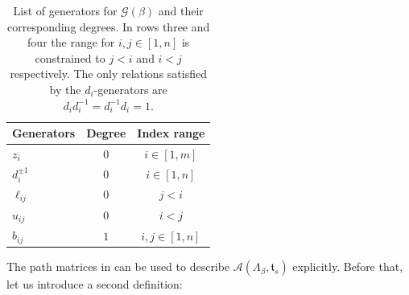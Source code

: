 \documentclass[11pt]{article}
\newcommand{\La}{\Lambda}
\newcommand{\SA}{\mathcal A}
\newcommand{\ST}{\mathfrak t}
\newcommand{\cG}{\mathcal G}
\begin{document}
\begin{table}[htpb]
    \centering
    \begin{tabular}{lcc}
        \toprule
        \textbf{Generators} & \textbf{Degree} & \textbf{Index range} \\
        \midrule
        $z_{i}$ & 0 & $i\in [1,m]$ \\
        $d_i^{\pm1}$ & 0 & $i\in [1,n]$ \\
        $\ell_{ij}$ & 0 & $j<i$ \\
        $u_{ij}$ & $0$ & $i<j$ \\
        $b_{ij}$ & $1$ & $i,j\in [1,n]$ \\
        \bottomrule
    \end{tabular}
    \caption{List of generators for \(\cG(\beta)\) and their corresponding degrees. In rows three and four the range for $i,j\in[1,n]$ is constrained to $j<i$ and $i<j$ respectively. The only relations satisfied by the $d_i$-generators are $d_id_i^{-1}=d_i^{-1}d_i=1$.}
    \label{tab:generators}
\end{table}

The path matrices in  can be used to describe $\SA(\La_\beta,\ST_{s})$ explicitly. Before that, let us introduce a second definition:
\end{document}
